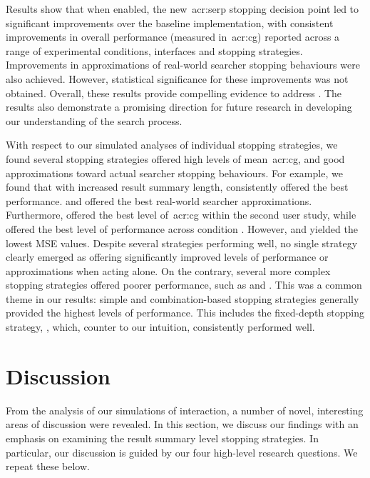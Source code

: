 Results show that when enabled, the new~\gls{acr:serp} stopping decision point led to significant improvements over the baseline implementation, with consistent improvements in overall performance (measured in~\gls{acr:cg}) reported across a range of experimental conditions, interfaces and stopping strategies. Improvements in approximations of real-world searcher stopping behaviours were also achieved. However, statistical significance for these improvements was not obtained. Overall, these results provide compelling evidence to address . The results also demonstrate a promising direction for future research in developing our understanding of the search process.

With respect to our simulated analyses of individual stopping strategies, we found several stopping strategies offered high levels of mean~\gls{acr:cg}, and good approximations toward actual searcher stopping behaviours. For example, we found that with increased result summary length,  consistently offered the best performance.  and  offered the best real-world searcher approximations. Furthermore,  offered the best level of~\gls{acr:cg} within the second user study, while  offered the best level of performance across condition . However,  and  yielded the lowest MSE values. Despite several strategies performing well, no single strategy clearly emerged as offering significantly improved levels of performance or approximations when acting alone. On the contrary, several more complex stopping strategies offered poorer performance, such as  and . This was a common theme in our results: simple and combination-based stopping strategies generally provided the highest levels of performance. This includes the fixed-depth stopping strategy, , which, counter to our intuition, consistently performed well.

\section{Discussion}\label{sec:conclusions:discussion}
From the analysis of our simulations of interaction, a number of novel, interesting areas of discussion were revealed. In this section, we discuss our findings with an emphasis on examining the result summary level stopping strategies. In particular, our discussion is guided by our four high-level research questions. We repeat these below.

